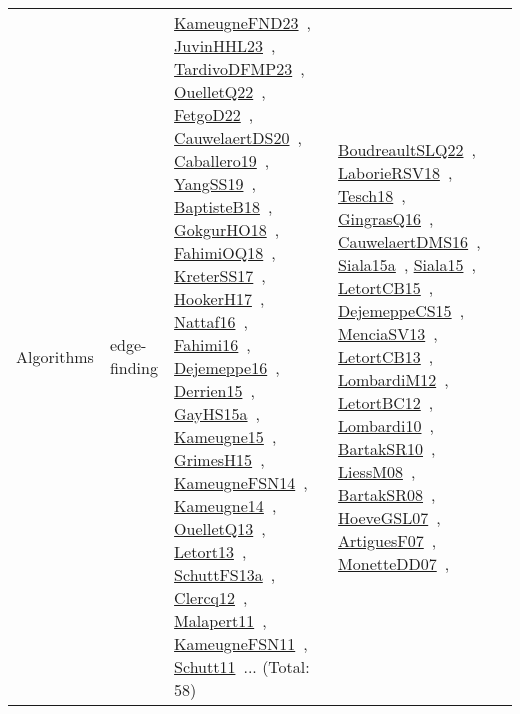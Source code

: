 {\begin{longtable}{lp{3cm}>{\raggedright\arraybackslash}p{6cm}>{\raggedright\arraybackslash}p{6cm}>{\raggedright\arraybackslash}p{8cm}}
\index{edge-finding}\index{Algorithms!edge-finding}Algorithms & edge-finding & \href{../works/KameugneFND23.pdf}{KameugneFND23}~\cite{KameugneFND23}, \href{../works/JuvinHHL23.pdf}{JuvinHHL23}~\cite{JuvinHHL23}, \href{../works/TardivoDFMP23.pdf}{TardivoDFMP23}~\cite{TardivoDFMP23}, \href{../works/OuelletQ22.pdf}{OuelletQ22}~\cite{OuelletQ22}, \href{../works/FetgoD22.pdf}{FetgoD22}~\cite{FetgoD22}, \href{../works/CauwelaertDS20.pdf}{CauwelaertDS20}~\cite{CauwelaertDS20}, \href{../works/Caballero19.pdf}{Caballero19}~\cite{Caballero19}, \href{../works/YangSS19.pdf}{YangSS19}~\cite{YangSS19}, \href{../works/BaptisteB18.pdf}{BaptisteB18}~\cite{BaptisteB18}, \href{../works/GokgurHO18.pdf}{GokgurHO18}~\cite{GokgurHO18}, \href{../works/FahimiOQ18.pdf}{FahimiOQ18}~\cite{FahimiOQ18}, \href{../works/KreterSS17.pdf}{KreterSS17}~\cite{KreterSS17}, \href{../works/HookerH17.pdf}{HookerH17}~\cite{HookerH17}, \href{../works/Nattaf16.pdf}{Nattaf16}~\cite{Nattaf16}, \href{../works/Fahimi16.pdf}{Fahimi16}~\cite{Fahimi16}, \href{../works/Dejemeppe16.pdf}{Dejemeppe16}~\cite{Dejemeppe16}, \href{../works/Derrien15.pdf}{Derrien15}~\cite{Derrien15}, \href{../works/GayHS15a.pdf}{GayHS15a}~\cite{GayHS15a}, \href{../works/Kameugne15.pdf}{Kameugne15}~\cite{Kameugne15}, \href{../works/GrimesH15.pdf}{GrimesH15}~\cite{GrimesH15}, \href{../works/KameugneFSN14.pdf}{KameugneFSN14}~\cite{KameugneFSN14}, \href{../works/Kameugne14.pdf}{Kameugne14}~\cite{Kameugne14}, \href{../works/OuelletQ13.pdf}{OuelletQ13}~\cite{OuelletQ13}, \href{../works/Letort13.pdf}{Letort13}~\cite{Letort13}, \href{../works/SchuttFS13a.pdf}{SchuttFS13a}~\cite{SchuttFS13a}, \href{../works/Clercq12.pdf}{Clercq12}~\cite{Clercq12}, \href{../works/Malapert11.pdf}{Malapert11}~\cite{Malapert11}, \href{../works/KameugneFSN11.pdf}{KameugneFSN11}~\cite{KameugneFSN11}, \href{../works/Schutt11.pdf}{Schutt11}~\cite{Schutt11}... (Total: 58) & \href{../works/BoudreaultSLQ22.pdf}{BoudreaultSLQ22}~\cite{BoudreaultSLQ22}, \href{../works/LaborieRSV18.pdf}{LaborieRSV18}~\cite{LaborieRSV18}, \href{../works/Tesch18.pdf}{Tesch18}~\cite{Tesch18}, \href{../works/GingrasQ16.pdf}{GingrasQ16}~\cite{GingrasQ16}, \href{../works/CauwelaertDMS16.pdf}{CauwelaertDMS16}~\cite{CauwelaertDMS16}, \href{../works/Siala15a.pdf}{Siala15a}~\cite{Siala15a}, \href{../works/Siala15.pdf}{Siala15}~\cite{Siala15}, \href{../works/LetortCB15.pdf}{LetortCB15}~\cite{LetortCB15}, \href{../works/DejemeppeCS15.pdf}{DejemeppeCS15}~\cite{DejemeppeCS15}, \href{../works/MenciaSV13.pdf}{MenciaSV13}~\cite{MenciaSV13}, \href{../works/LetortCB13.pdf}{LetortCB13}~\cite{LetortCB13}, \href{../works/LombardiM12.pdf}{LombardiM12}~\cite{LombardiM12}, \href{../works/LetortBC12.pdf}{LetortBC12}~\cite{LetortBC12}, \href{../works/Lombardi10.pdf}{Lombardi10}~\cite{Lombardi10}, \href{../works/BartakSR10.pdf}{BartakSR10}~\cite{BartakSR10}, \href{../works/LiessM08.pdf}{LiessM08}~\cite{LiessM08}, \href{../works/BartakSR08.pdf}{BartakSR08}~\cite{BartakSR08}, \href{../works/HoeveGSL07.pdf}{HoeveGSL07}~\cite{HoeveGSL07}, \href{../works/ArtiguesF07.pdf}{ArtiguesF07}~\cite{ArtiguesF07}, \href{../works/MonetteDD07.pdf}{MonetteDD07}~\cite{MonetteDD07}, 
\end{longtable}}
